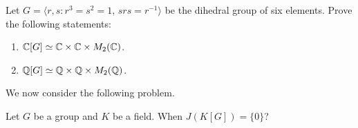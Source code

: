 \begin{exercise}
	Let $G=\langle r,s:r^3=s^2=1,\,srs=r^{-1}\rangle$ be the dihedral group of six elements. 
	Prove the following statements:
	\begin{enumerate}
	    \item $\mathbb{C}[G]\simeq\mathbb{C}\times\mathbb{C}\times M_2(\mathbb{C})$.
	    \item $\mathbb{Q}[G]\simeq\mathbb{Q}\times\mathbb{Q}\times M_2(\mathbb{Q})$.
	\end{enumerate}  
\end{exercise}

We now consider the following problem. 

\begin{openproblem}
Let $G$ be a group and $K$ be a field. When $J(K[G])=\{0\}$?
\end{openproblem}

